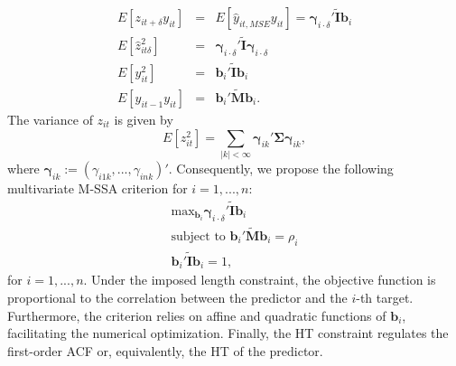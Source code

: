 \documentclass[11pt,a4paper]{article}
\begin{document}
\begin{eqnarray}
E[z_{it+\delta}y_{it}]&=&E[\hat{y}_{it,MSE}y_{it}]=\boldsymbol{\gamma}_{i\cdot\delta}'\tilde{\mathbf{I}}\mathbf{b}_{i}\nonumber\\%
E[\hat{z}_{it\delta}^2]&=&\boldsymbol{\gamma}_{i\cdot\delta}'\tilde{\mathbf{I}}\boldsymbol{\gamma}_{i\cdot\delta}\nonumber\\%
E[y_{it}^2]&=&\mathbf{b}_{i}'\tilde{\mathbf{I}}\mathbf{b}_{i}\nonumber\\%
E[y_{it-1}y_{it}]&=&\mathbf{b}_{i}'\tilde{\mathbf{M}}\mathbf{b}_{i}.\nonumber
\end{eqnarray}
The variance of $z_{it}$ is given by 
\[
E[z_{it}^2]=\sum_{|k|<\infty}\boldsymbol{\gamma}_{i k}'\boldsymbol{\Sigma}\boldsymbol{\gamma}_{i k},
\]
where $\boldsymbol{\gamma}_{i k}:=(\gamma_{i1k},...,\gamma_{ink})'$. Consequently, we propose the following multivariate M-SSA criterion for $i=1,...,n$: 
\begin{eqnarray}\label{mcrit1}
\textrm{max}_{\mathbf{b}_i}\boldsymbol{\gamma}_{i\cdot\delta}'\tilde{\mathbf{I}}\mathbf{b}_{i}\\
\textrm{subject~to~}\mathbf{b}_{i}'\tilde{\mathbf{M}}\mathbf{b}_{i}=\rho_i\nonumber\\
\mathbf{b}_{i}'\tilde{\mathbf{I}}\mathbf{b}_{i}=1,\nonumber
\end{eqnarray}
for $i=1,...,n$. 
Under the imposed length constraint, the objective function is proportional to the correlation between the predictor and the $i$-th target. Furthermore, the criterion relies on affine and quadratic functions of $\mathbf{b}_i$, facilitating the numerical optimization. Finally, the HT constraint regulates the first-order ACF or, equivalently, the HT of the predictor.\\
\end{document}
